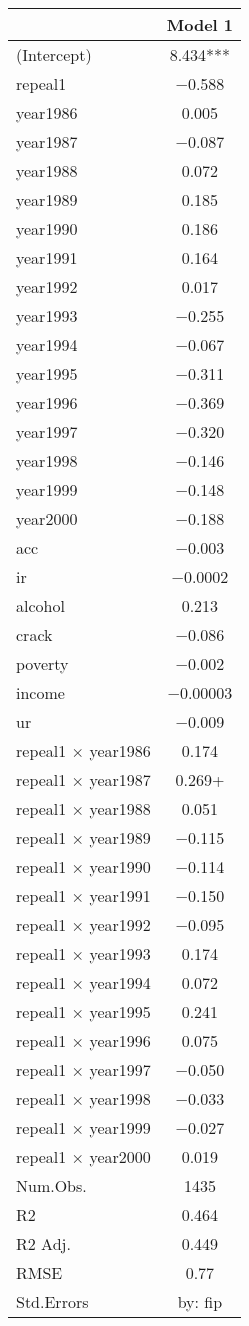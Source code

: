 \documentclass[
]{article}
\begin{document}
\begin{table}
\centering
\begin{tabular}[t]{lc}
\toprule
  & Model 1\\
\midrule
(Intercept) & \num{8.434}***\\
repeal1 & \num{-0.588}\\
year1986 & \num{0.005}\\
year1987 & \num{-0.087}\\
year1988 & \num{0.072}\\
year1989 & \num{0.185}\\
year1990 & \num{0.186}\\
year1991 & \num{0.164}\\
year1992 & \num{0.017}\\
year1993 & \num{-0.255}\\
year1994 & \num{-0.067}\\
year1995 & \num{-0.311}\\
year1996 & \num{-0.369}\\
year1997 & \num{-0.320}\\
year1998 & \num{-0.146}\\
year1999 & \num{-0.148}\\
year2000 & \num{-0.188}\\
acc & \num{-0.003}\\
ir & \num{-0.0002}\\
alcohol & \num{0.213}\\
crack & \num{-0.086}\\
poverty & \num{-0.002}\\
income & \num{-0.00003}\\
ur & \num{-0.009}\\
repeal1 × year1986 & \num{0.174}\\
repeal1 × year1987 & \num{0.269}+\\
repeal1 × year1988 & \num{0.051}\\
repeal1 × year1989 & \num{-0.115}\\
repeal1 × year1990 & \num{-0.114}\\
repeal1 × year1991 & \num{-0.150}\\
repeal1 × year1992 & \num{-0.095}\\
repeal1 × year1993 & \num{0.174}\\
repeal1 × year1994 & \num{0.072}\\
repeal1 × year1995 & \num{0.241}\\
repeal1 × year1996 & \num{0.075}\\
repeal1 × year1997 & \num{-0.050}\\
repeal1 × year1998 & \num{-0.033}\\
repeal1 × year1999 & \num{-0.027}\\
repeal1 × year2000 & \num{0.019}\\
\midrule
Num.Obs. & \num{1435}\\
R2 & \num{0.464}\\
R2 Adj. & \num{0.449}\\
RMSE & \num{0.77}\\
Std.Errors & by: fip\\
\bottomrule
\end{tabular}
\end{table}
\end{document}
